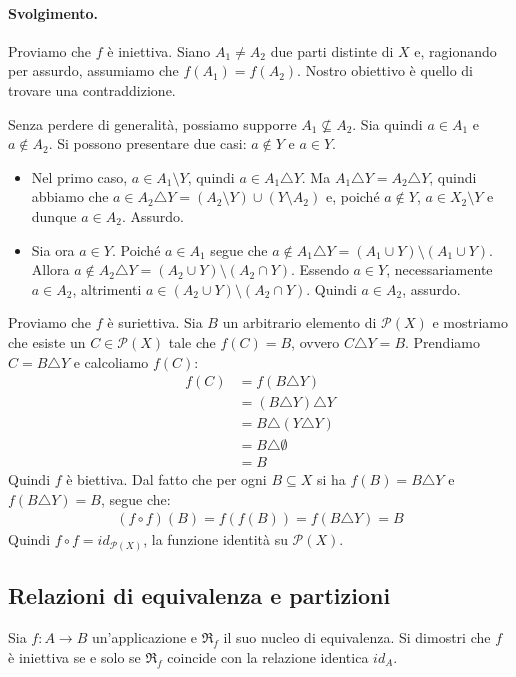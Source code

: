 \paragraph{Svolgimento.} Proviamo che $f$ è iniettiva. Siano $A_{1} \neq A_{2}$ due parti distinte di $X$ e, ragionando per assurdo, assumiamo che $f(A_{1})=f(A_{2})$. Nostro obiettivo è quello di trovare una contraddizione. 

Senza perdere di generalità, possiamo supporre $A_{1} \nsubseteq A_{2}$. Sia quindi $a \in A_{1}$ e $a \notin A_{2}$. Si possono presentare due casi: $a \notin Y$ e $a \in Y$. 
\begin{itemize}
	\item Nel primo caso, $a \in A_{1} \setminus Y$, quindi $a \in A_{1} \triangle Y$. Ma $A_{1} \triangle Y = A_{2} \triangle Y$, quindi abbiamo che $a \in A_{2} \triangle Y = (A_{2} \setminus Y) \cup (Y \setminus A_{2})$ e, poiché $a \notin Y$, $a \in X_{2} \setminus Y$ e dunque $a \in A_{2}$. Assurdo.
	\item Sia ora $a \in Y$. Poiché $a \in A_{1}$ segue che $a \notin A_{1} \triangle Y = (A_{1} \cup Y) \setminus (A_{1} \cup Y)$. Allora $a \notin A_{2} \triangle Y = (A_{2} \cup Y) \setminus (A_{2} \cap Y)$. Essendo $a \in Y$, necessariamente $a \in A_{2}$, altrimenti $a \in (A_{2} \cup Y) \setminus (A_{2} \cap Y)$. Quindi $a \in A_{2}$, assurdo.
\end{itemize}

Proviamo che $f$ è suriettiva. Sia $B$ un arbitrario elemento di $\mathcal{P}(X)$ e mostriamo che esiste un $C \in \mathcal{P}(X)$ tale che $f(C) = B$, ovvero $C \triangle Y = B$. Prendiamo $C = B \triangle Y$ e calcoliamo $f(C)$:
\begin{align*}
	f(C) &= f(B \triangle Y) \\
	&= (B \triangle Y) \triangle Y \\
	&= B \triangle (Y \triangle Y) \\
	&= B \triangle \emptyset \\
	&= B
\end{align*}
Quindi $f$ è biettiva. Dal fatto che per ogni $B \subseteq X$ si ha $f(B) = B \triangle Y$ e $f(B \triangle Y) = B$, segue che:
\begin{align*}
	(f \circ f)(B) = f(f(B)) = f(B \triangle Y) = B
\end{align*}
Quindi $f \circ f = id_{\mathcal{P}(X)}$, la funzione identità su $\mathcal{P}(X)$. \hfill \blacksquare
\subsection{Relazioni di equivalenza e partizioni}
\begin{exsbox}
	Sia $f: A \rightarrow B$ un'applicazione e $\mathfrak{R}_{f}$ il suo nucleo di equivalenza. Si dimostri che $f$ è iniettiva se e solo se $\mathfrak{R}_{f}$ coincide con la relazione identica $id_{A}$.
\end{exsbox}
